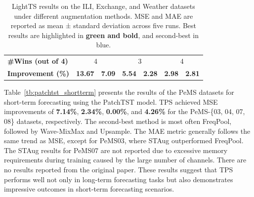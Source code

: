\begin{table}[h!]
\begin{adjustbox}{max width=\textwidth}
\begin{tabular}{l|cc|cc|cc}
    \midrule
    \textbf{\#Wins (out of 4)} & \multicolumn{2}{c|}{4} & \multicolumn{2}{c|}{3} & \multicolumn{2}{c}{4} \\
    \textbf{Improvement (\%)} & \cellcolor{bestcolor} \textbf{13.67} & \cellcolor{bestcolor} \textbf{7.09} & \cellcolor{bestcolor} \textbf{5.54} & \cellcolor{bestcolor} \textbf{2.28} & \cellcolor{bestcolor} \textbf{2.98} & \cellcolor{bestcolor} \textbf{2.81} \\
    \bottomrule
\end{tabular}
\end{adjustbox}
\caption{LightTS results on the ILI, Exchange, and Weather datasets under different augmentation methods. MSE and MAE are reported as mean ± standard deviation across five runs. Best results are highlighted in \textbf{green and bold}, and second-best in blue.}
\label{tb:lt2}
\end{table}



Table~\ref{tb:patchtst_shortterm} presents the results of the PeMS datasets for short-term forecasting using the PatchTST model. TPS achieved MSE improvements of \textbf{7.14\%}, \textbf{2.34\%}, \textbf{0.00\%}, and \textbf{4.26\%} for the PeMS-\{03, 04, 07, 08\} datasets, respectively. The second-best method is most often FreqPool, followed by Wave-MixMax and Upsample. The MAE metric generally follows the same trend as MSE, except for PeMS03, where STAug outperformed FreqPool. The STAug results for PeMS07 are not reported due to excessive memory requirements during training caused by the large number of channels. There are no results reported from the original paper. These results suggest that TPS performs well not only in long-term forecasting tasks but also demonstrates impressive outcomes in short-term forecasting scenarios.




